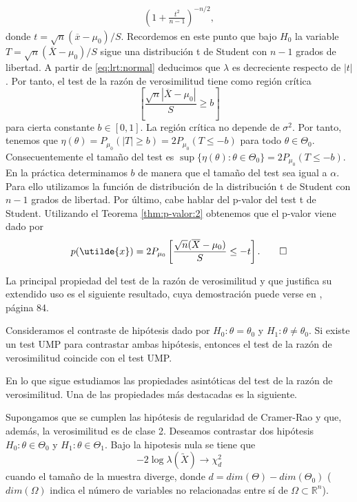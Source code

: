 \begin{ex}
\begin{equation}
\begin{split}
            \left(1 + \frac{t^2}{n-1}\right)^{-n/2},
            \end{split}
            \end{equation}
            donde $t = \sqrt{n}(\overline{x} - \mu_0) / S$. Recordemos en este punto que bajo $H_0$ la variable $T = \sqrt{n}(\overline{X} - \mu_0) / S$ sigue una distribución t de Student con $n-1$ grados de libertad. A partir de \eqref{eq:lrt:normal} deducimos que $\lambda$ es decreciente respecto de $|t|$. Por tanto, el test de la razón de verosimilitud tiene como región crítica
            \[\left[\frac{\sqrt{n}|\overline{X} - \mu_0|}{S} \ge b\right]\]
            para cierta constante $b \in [0,1]$. La región crítica no depende de $\sigma^2$. Por tanto, tenemos que $\eta(\theta) = P_{\mu_0}(|T| \ge b) = 2 P_{\mu_0}(T \le -b)$ para todo $\theta \in \Theta_0$. Consecuentemente el tamaño del test es $\sup\{\eta(\theta): \theta \in \Theta_0\} = 2P_{\mu_0}(T \le -b)$. En la práctica determinamos $b$ de manera que el tamaño del test sea igual a $\alpha$. Para ello utilizamos la función de distribución de la distribución t de Student con $n-1$ grados de libertad.
            Por último, cabe hablar del p-valor del test t de Student. Utilizando el Teorema \ref{thm:p-valor:2} obtenemos que el p-valor viene dado por
            \[p(\utilde{x}) = 2P_{\mu_0}\left[\frac{\sqrt{n}(\overline{X} - \mu_0)}{S} \le -t\right]. \qedhere\]
        \end{ex}

        La principal propiedad del test de la razón de verosimilitud y que justifica su extendido uso es el siguiente resultado, cuya demostración puede verse en \cite{garthwaite}, página 84.

        \begin{thm}
            Consideramos el contraste de hipótesis dado por $H_0: \theta = \theta_0$ y $H_1: \theta \ne \theta_0$. Si existe un test UMP para contrastar ambas hipótesis, entonces el test de la razón de verosimilitud coincide con el test UMP.
        \end{thm}

        En lo que sigue estudiamos las propiedades asintóticas del test de la razón de verosimilitud. Una de las propiedades más destacadas es la siguiente.

        \begin{thm}
            Supongamos que se cumplen las hipótesis de regularidad de Cramer-Rao y que, además, la verosimilitud es de clase 2. Deseamos contrastar dos hipótesis $H_0: \theta \in \Theta_0$ y $H_1: \theta \in \Theta_1$. Bajo la hipotesis nula se tiene que
            \[-2 \log \lambda(\utilde{X}) \to \chi_d^2\]
            cuando el tamaño de la muestra diverge, donde $d = dim(\Theta) - dim(\Theta_0)$ ($dim(\Omega)$ indica el número de variables no relacionadas entre sí de $\Omega \subset \mathbb{R}^n$).
        \end{thm}

